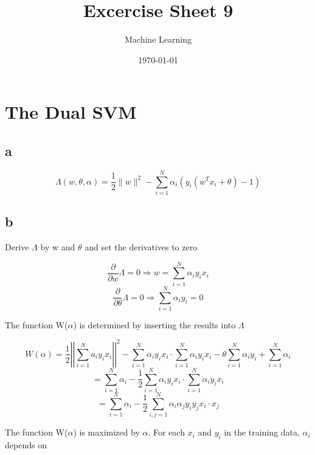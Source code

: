 \documentclass[11pt,abstract=on]{scrartcl}
\title{Excercise Sheet 9}
\subtitle{Machine Learning}
\date{\today}
\begin{document}
\maketitle
\section{The Dual SVM}
\subsection{a}
\begin{equation*}
\Lambda(w,\theta,\alpha) = \frac{1}{2}  \lVert w \rVert^2 - \sum\limits_{i=1}^{N} \alpha_{i}(y_{i}(w^T x_{i} + \theta)-1)
\end{equation*}

\subsection{b}
Derive $\Lambda$ by w and $\theta$ and set the derivatives to zero

\begin{equation*}
\frac{\partial}{\partial w} \Lambda = 0 \Rightarrow w = \sum\limits_{i=1}^{N}\alpha_i y_i x_i
\end{equation*}
\begin{equation*}
 \frac{\partial}{\partial \theta} \Lambda = 0 \Rightarrow \sum\limits_{i=1}^{N}\alpha_i y_i = 0
\end{equation*}

The function W($\alpha$) is determined by inserting the results into $\Lambda$

\begin{equation*}
W(\alpha) = \frac{1}{2} \left|\left| \sum\limits_{i=1}^{N}a_i y_i x_i \right|\right|^2 - \sum\limits_{i=1}^{N} \alpha_i y_i x_i \cdot\sum\limits_{i=1}^{N} \alpha_i y_i x_i - \theta \sum\limits_{i=1}^{N} \alpha_i y_i + \sum\limits_{i=1}^{N} \alpha_i
\end{equation*}
\begin{equation*}
= \sum\limits_{i=1}^{N} \alpha_i-\frac{1}{2} \sum\limits_{i=1}^{N} \alpha_i y_i x_i \cdot \sum\limits_{i=1}^{N} \alpha_i y_i x_i
\end{equation*}
\begin{equation*}
= \sum\limits_{i=1}^{N} \alpha_i-\frac{1}{2} \sum\limits_{i,j=1}^{N} \alpha_i \alpha_j y_i y_j x_i \cdot x_j
\end{equation*}

The function W($\alpha$) is maximized by $\alpha$. For each $x_i$ and $y_i$ in the training data, $\alpha_i$ depends on
\end{document}
